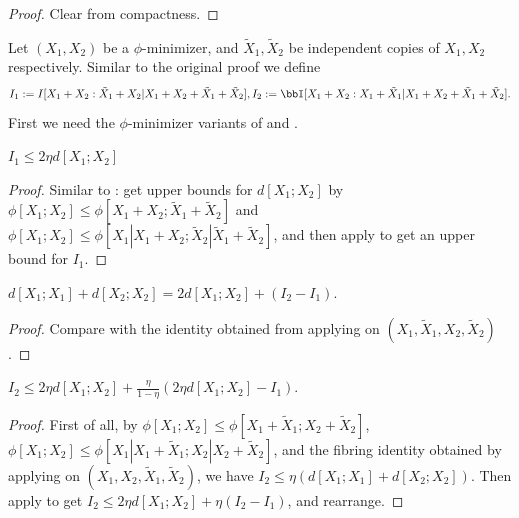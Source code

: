 \begin{proof}\leanok{} Clear from compactness.
\end{proof}

Let $(X_1, X_2)$ be a $\phi$-minimizer, and $\tilde X_1, \tilde X_2$ be independent copies of $X_1,X_2$ respectively.
Similar to the original proof we define
$$ I_1 :=  I [X_1+X_2 : \tilde X_1 + X_2 | X_1+X_2+\tilde X_1+\tilde X_2], I_2 := \bbI[X_1+X_2 : X_1 + \tilde X_1 | X_1+X_2+\tilde X_1+\tilde X_2].$$
First we need the $\phi$-minimizer variants of  and .

\begin{lemma}\label{phi-first-estimate}\leanok
$I_1\le 2\eta d[X_1;X_2]$
\end{lemma}

\begin{proof}\leanok
Similar to : get upper bounds for $d[X_1;X_2]$ by $\phi[X_1;X_2]\le \phi[X_1+X_2;\tilde X_1+\tilde X_2]$ and $\phi[X_1;X_2]\le \phi[X_1|X_1+X_2;\tilde X_2|\tilde X_1+\tilde X_2]$, and then apply  to get an upper bound for $I_1$.
\end{proof}

\begin{lemma}\label{I1-I2-diff}\leanok
  $d[X_1;X_1]+d[X_2;X_2]= 2d[X_1;X_2]+(I_2-I_1)$.
\end{lemma}
\begin{proof}\leanok
Compare  with the identity obtained from applying  on $(X_1,\tilde X_1, X_2, \tilde X_2)$.
\end{proof}

\begin{lemma}\label{phi-second-estimate}\leanok
$I_2\le 2\eta d[X_1;X_2] + \frac{\eta}{1-\eta}(2\eta d[X_1;X_2]-I_1)$.
\end{lemma}

\begin{proof}\leanok
First of all, by $\phi[X_1;X_2]\le \phi[X_1+\tilde X_1;X_2+\tilde X_2]$, $\phi[X_1;X_2]\le \phi[X_1|X_1+\tilde X_1;X_2|X_2+\tilde X_2]$, and the fibring identity obtained by applying  on $(X_1,X_2,\tilde X_1,\tilde X_2)$,
we have $I_2\le \eta (d[X_1;X_1]+d[X_2;X_2])$. Then apply  to get $I_2\le 2\eta d[X_1;X_2] +\eta(I_2-I_1)$, and rearrange.
\end{proof}


